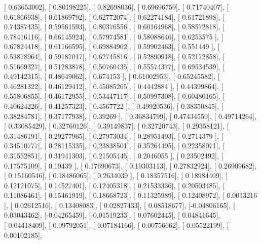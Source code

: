 \documentclass{article}
\begin{document}
       [ 0.63653002],
       [ 0.80198225],
       [ 0.82698036],
       [ 0.69696759],
       [ 0.71740407],
       [ 0.61866938],
       [ 0.61869792],
       [ 0.62772074],
       [ 0.62274184],
       [ 0.61721898],
       [ 0.74387435],
       [ 0.59561593],
       [ 0.80376556],
       [ 0.60164968],
       [ 0.58572818],
       [ 0.78416116],
       [ 0.66145924],
       [ 0.57974581],
       [ 0.58088646],
       [ 0.6253575 ],
       [ 0.67824418],
       [ 0.61166595],
       [ 0.69884962],
       [ 0.59902463],
       [ 0.551449  ],
       [ 0.53878964],
       [ 0.59187017],
       [ 0.62745816],
       [ 0.52890918],
       [ 0.52172858],
       [ 0.51669327],
       [ 0.51283878],
       [ 0.50760435],
       [ 0.55574377],
       [ 0.69534539],
       [ 0.49142315],
       [ 0.48649062],
       [ 0.674153  ],
       [ 0.61002953],
       [ 0.65245582],
       [ 0.46281322],
       [ 0.46129412],
       [ 0.45085265],
       [ 0.4442884 ],
       [ 0.44399864],
       [ 0.55806855],
       [ 0.46172955],
       [ 0.53447117],
       [ 0.50997308],
       [ 0.60480165],
       [ 0.40624226],
       [ 0.41257323],
       [ 0.4567722 ],
       [ 0.49920536],
       [ 0.38350845],
       [ 0.38284781],
       [ 0.37177938],
       [ 0.39269   ],
       [ 0.36834799],
       [ 0.47434559],
       [ 0.49714264],
       [ 0.33085429],
       [ 0.32760126],
       [ 0.39149837],
       [ 0.32720743],
       [ 0.29358121],
       [ 0.31486191],
       [ 0.29277965],
       [ 0.27973034],
       [ 0.28951493],
       [ 0.2714379 ],
       [ 0.34510777],
       [ 0.28115335],
       [ 0.23838501],
       [ 0.35264495],
       [ 0.22358071],
       [ 0.31552851],
       [ 0.31941303],
       [ 0.21505445],
       [ 0.2046055 ],
       [ 0.23502492],
       [ 0.17575109],
       [ 0.19439   ],
       [ 0.17690673],
       [ 0.19303113],
       [ 0.27832924],
       [ 0.26909682],
       [ 0.15160546],
       [ 0.18486065],
       [ 0.2634039 ],
       [ 0.18357516],
       [ 0.18984409],
       [ 0.12121075],
       [ 0.14527401],
       [ 0.12405318],
       [ 0.21533336],
       [ 0.20503485],
       [ 0.11086461],
       [ 0.15461919],
       [ 0.18668723],
       [ 0.11325989],
       [ 0.12408972],
       [ 0.0013216 ],
       [ 0.02612516],
       [ 0.13408083],
       [ 0.02827433],
       [ 0.08518677],
       [-0.04806165],
       [ 0.03043462],
       [-0.04265459],
       [-0.01519233],
       [ 0.07602445],
       [ 0.04841645],
       [-0.04418409],
       [-0.09792051],
       [ 0.07184166],
       [ 0.00756662],
       [-0.05522199],
       [ 0.00102185],
\end{document}
